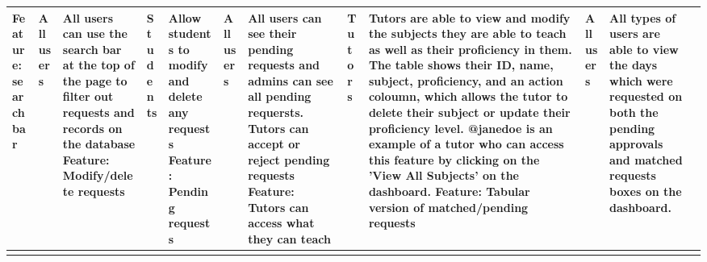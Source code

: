 \documentclass[11pt,a4paper]{article}
\begin{document}
\begin{tabular}{|p{30mm}|p{25mm}|p{50mm}|}
 \hline
Feature: search bar & All users & All users can use the search bar at the top of the page to filter out requests and records on the database
 \hline
Feature: Modify/delete requests & Students & Allow students to modify and delete any requests
 \hline
Feature: Pending requests & All users & All users can see their pending requests and admins can see all pending requersts. Tutors can accept or reject pending requests
 \hline
 Feature: Tutors can access what they can teach & Tutors & Tutors are able to view and modify the subjects they are able to teach as well as their proficiency in them. The table shows their ID, name, subject, proficiency, and an action coloumn, which allows the tutor to delete their subject or update their proficiency level. @janedoe is an example of a tutor who can access this feature by clicking on the 'View All Subjects' on the dashboard. 
 \hline
 Feature: Tabular version of matched/pending requests & All users & All types of users are able to view the days which were requested on both the pending approvals and matched requests boxes on the dashboard.
 \hline
  & & \\
 \hline
  & & \\
 \hline
\end{tabular}
\end{document}
